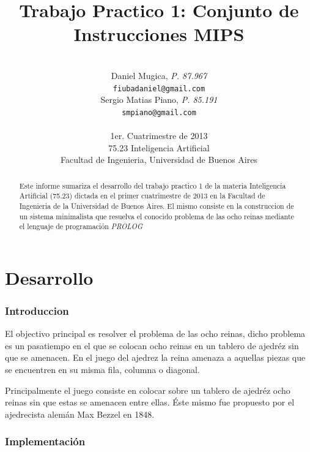 \documentclass[a4paper,11pt]{article}
\title{\textbf{Trabajo Practico 1: Conjunto de Instrucciones MIPS}}
\author{\\
  Daniel Mugica, \textit{P. 87.967}                                \\
  \texttt{fiubadaniel@gmail.com}                                   \\ [2.5ex]
  Sergio Matias Piano, \textit{P. 85.191}                          \\
  \texttt{smpiano@gmail.com}                                       \\ [2.5ex]
                                                                   \\
  \normalsize{1er. Cuatrimestre de 2013}                           \\
  \normalsize{75.23 Inteligencia Artificial}                       \\
  \normalsize{Facultad de Ingenieria, Universidad de Buenos Aires} \\
}
\date{}
\begin{document}
\thispagestyle{empty}
\maketitle

\begin{abstract}

  Este informe sumariza el desarrollo del trabajo practico 1 de la materia
  Inteligencia Artificial (75.23) dictada en el primer cuatrimestre de
  2013 en la Facultad de Ingenieria de la Universidad de Buenos Aires. El mismo
  consiste en la construccion de un sistema minimalista que resuelva el 
  conocido problema de las ocho reinas mediante el lenguaje de programación
  \textit{PROLOG}

\end{abstract}

\clearpage

\tableofcontents
\clearpage


\part{Desarrollo}

\section{Introduccion}

  El objectivo principal es resolver el problema de las ocho reinas, dicho problema
  es un pasatiempo en el que se colocan ocho reinas en un tablero de ajedréz sin 
  que se amenacen. En el juego del ajedrez la reina amenaza a aquellas piezas que 
  se encuentren en su misma fila, columna o diagonal.
  
  Principalmente el juego consiste en colocar sobre un tablero de ajedréz ocho 
  reinas sin que estas se amenacen entre ellas. Éste mismo fue propuesto por 
  el ajedrecista alemán Max Bezzel en 1848.

\section{Implementación}
\end{document}

